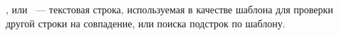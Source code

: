 \label{regexp}

, или 
\ --- текстовая строка, используемая в качестве
шаблона для проверки другой строки на совпадение, или поиска подстрок по
шаблону.

